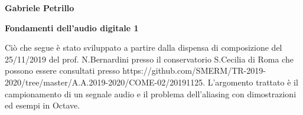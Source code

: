 \documentclass[11pt]{article}
\begin{document}
\begin{minipage}{0.55\linewidth}
\vspace{0.3cm}
{\large{\textbf{\textsf{Gabriele Petrillo}}}}\\\end{minipage}

\vspace{0.3cm}
\begin{minipage}{0.95\linewidth}
\begin{center}
{\huge{\textbf{\textsf{Fondamenti dell'audio digitale 1}}}} \\
\end{center}
\end{minipage}
\vspace*{0.2cm}


\begin{center}
\begin{minipage}[c]{14cm}
\begin{textit}

Ciò che segue è stato sviluppato a partire dalla dispensa di composizione del 25/11/2019 del prof. N.Bernardini presso il conservatorio S.Cecilia di Roma che possono essere consultati presso https://github.com/SMERM/TR-2019-2020/tree/master/A.A.2019-2020/COME-02/20191125. L'argomento trattato è il campionamento di un segnale audio e il problema dell'aliasing con dimostrazioni ed esempi in Octave.

\end{textit}
\end{minipage}
\end{center}
\vspace*{0.2cm}

\end{document}
